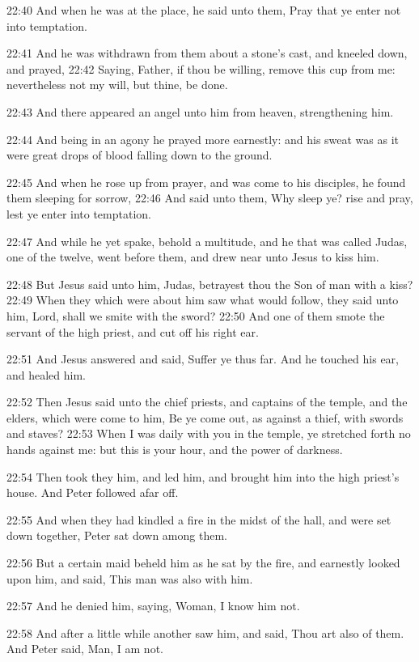 22:40 And when he was at the place, he said unto them, Pray that ye enter not into temptation.

22:41 And he was withdrawn from them about a stone's cast, and kneeled down, and prayed, 22:42 Saying, Father, if thou be willing, remove this cup from me: nevertheless not my will, but thine, be done.

22:43 And there appeared an angel unto him from heaven, strengthening him.

22:44 And being in an agony he prayed more earnestly: and his sweat was as it were great drops of blood falling down to the ground.

22:45 And when he rose up from prayer, and was come to his disciples, he found them sleeping for sorrow, 22:46 And said unto them, Why sleep ye? rise and pray, lest ye enter into temptation.

22:47 And while he yet spake, behold a multitude, and he that was called Judas, one of the twelve, went before them, and drew near unto Jesus to kiss him.

22:48 But Jesus said unto him, Judas, betrayest thou the Son of man with a kiss?  22:49 When they which were about him saw what would follow, they said unto him, Lord, shall we smite with the sword?  22:50 And one of them smote the servant of the high priest, and cut off his right ear.

22:51 And Jesus answered and said, Suffer ye thus far. And he touched his ear, and healed him.

22:52 Then Jesus said unto the chief priests, and captains of the temple, and the elders, which were come to him, Be ye come out, as against a thief, with swords and staves?  22:53 When I was daily with you in the temple, ye stretched forth no hands against me: but this is your hour, and the power of darkness.

22:54 Then took they him, and led him, and brought him into the high priest's house. And Peter followed afar off.

22:55 And when they had kindled a fire in the midst of the hall, and were set down together, Peter sat down among them.

22:56 But a certain maid beheld him as he sat by the fire, and earnestly looked upon him, and said, This man was also with him.

22:57 And he denied him, saying, Woman, I know him not.

22:58 And after a little while another saw him, and said, Thou art also of them. And Peter said, Man, I am not.

